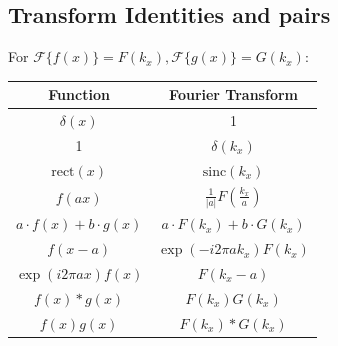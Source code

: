 \documentclass[11pt]{article}
\begin{document}
\subsection*{Transform Identities and pairs}
For 
$\mathcal{F}\{f(x)\} = F(k_x), \mathcal{F}\{g(x)\} = G(k_x)$:
\begin{center}
\begin{tabular}{|c|c|}
\hline
Function & Fourier Transform\\
\hline
$\delta(x)$ & 1 \\
1 & $\delta(k_x)$ \\
$\mathrm{rect}(x)$ & $\mathrm{sinc}(k_x)$ \\
$f(ax)$ & $\frac{1}{|a|} F(\frac{k_x}{a})$\\
$a \cdot f(x) + b \cdot g(x)$ & $a \cdot F(k_x) + b \cdot G(k_x)$ \\
$f(x-a)$ & $\exp(-i 2\pi a k_x) F(k_x)$\\
$\exp(i 2\pi a x) f(x)$ & $F(k_x - a)$\\
$f(x) \ast g(x)$ & $F(k_x) G(k_x)$ \\
$f(x) g(x)$ & $F(k_x) \ast G(k_x)$ \\
\hline
\end{tabular}
\end{center}
\end{document}
